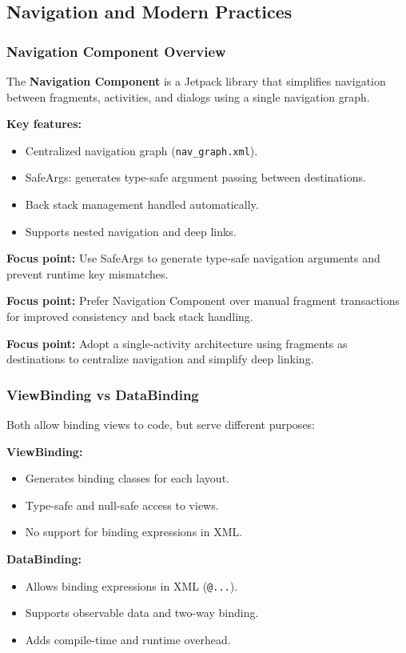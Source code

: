 \documentclass[a4paper,12pt]{article}
\begin{document}
\subsection{Navigation and Modern Practices}

\subsubsection{Navigation Component Overview}

The \textbf{Navigation Component} is a Jetpack library that simplifies navigation between fragments, activities, and dialogs using a single navigation graph.

\textbf{Key features:}
\begin{itemize}
  \item Centralized navigation graph (\texttt{nav\_graph.xml}).
  \item SafeArgs: generates type-safe argument passing between destinations.
  \item Back stack management handled automatically.
  \item Supports nested navigation and deep links.
\end{itemize}

\textbf{Focus point:} Use SafeArgs to generate type-safe navigation arguments and prevent runtime key mismatches.

\textbf{Focus point:} Prefer Navigation Component over manual fragment transactions for improved consistency and back stack handling.

\textbf{Focus point:} Adopt a single-activity architecture using fragments as destinations to centralize navigation and simplify deep linking.

\subsubsection{ViewBinding vs DataBinding}

Both allow binding views to code, but serve different purposes:

\textbf{ViewBinding:}
\begin{itemize}
  \item Generates binding classes for each layout.
  \item Type-safe and null-safe access to views.
  \item No support for binding expressions in XML.
\end{itemize}

\textbf{DataBinding:}
\begin{itemize}
  \item Allows binding expressions in XML (\texttt{@{...}}).
  \item Supports observable data and two-way binding.
  \item Adds compile-time and runtime overhead.
\end{itemize}
\end{document}
